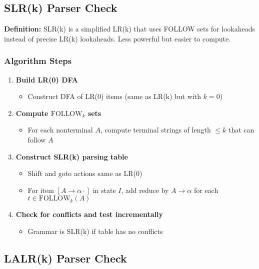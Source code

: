 \subsection{SLR(k) Parser Check}

\textbf{Definition:} SLR(k) is a simplified LR(k) that uses FOLLOW sets for lookaheads instead of precise LR(k) lookaheads. Less powerful but easier to compute.

\subsubsection{Algorithm Steps}

\begin{enumerate}
    \item \textbf{Build LR(0) DFA}
    \begin{itemize}
        \item Construct DFA of LR(0) items (same as LR(k) but with $k = 0$)
    \end{itemize}
    
    \item \textbf{Compute $\text{FOLLOW}_k$ sets}
    \begin{itemize}
        \item For each nonterminal $A$, compute terminal strings of length $\leq k$ that can follow $A$
    \end{itemize}
    
    \item \textbf{Construct SLR(k) parsing table}
    \begin{itemize}
        \item Shift and goto actions same as LR(0)
        \item For item $[A \to \alpha \cdot]$ in state $I$, add reduce by $A \to \alpha$ for each $t \in \text{FOLLOW}_k(A)$
    \end{itemize}
    
    \item \textbf{Check for conflicts and test incrementally}
    \begin{itemize}
        \item Grammar is SLR(k) if table has no conflicts
    \end{itemize}
\end{enumerate}

\subsection{LALR(k) Parser Check}


